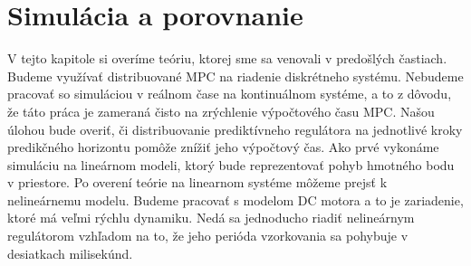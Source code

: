 \chapter{Simulácia a porovnanie}
\label{part:Simulacie}
V tejto kapitole si overíme teóriu, ktorej sme sa venovali v predošlých častiach. Budeme využívať distribuované MPC na riadenie diskrétneho systému. Nebudeme pracovať so simuláciou v reálnom čase na kontinuálnom systéme, a to z dôvodu, že táto práca je zameraná čisto na zrýchlenie výpočtového času MPC. Našou úlohou bude overiť, či distribuovanie prediktívneho regulátora na jednotlivé kroky predikčného horizontu pomôže znížiť jeho výpočtový čas. Ako prvé vykonáme simuláciu na lineárnom modeli, ktorý bude reprezentovať pohyb hmotného bodu v priestore. Po overení teórie na linearnom systéme môžeme prejsť k nelineárnemu modelu. Budeme pracovať s modelom DC motora a to je zariadenie, ktoré má veľmi rýchlu dynamiku. Nedá sa jednoducho riadiť nelineárnym regulátorom vzhľadom na to, že jeho perióda vzorkovania sa pohybuje v desiatkach milisekúnd.





